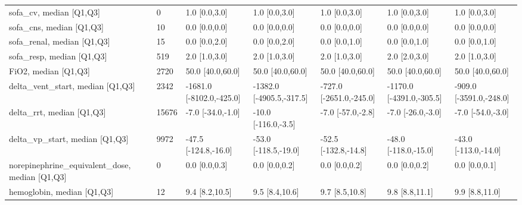 \begin{tabular}{llllllll}
sofa\_cv, median [Q1,Q3] &                                   &               0 &             1.0 [0.0,3.0] &             1.0 [0.0,3.0] &            1.0 [0.0,3.0] &             1.0 [0.0,3.0] &            1.0 [0.0,3.0] \\
sofa\_cns, median [Q1,Q3] &                                   &              10 &             0.0 [0.0,0.0] &             0.0 [0.0,0.0] &            0.0 [0.0,0.0] &             0.0 [0.0,0.0] &            0.0 [0.0,0.0] \\
sofa\_renal, median [Q1,Q3] &                                   &              15 &             0.0 [0.0,2.0] &             0.0 [0.0,2.0] &            0.0 [0.0,1.0] &             0.0 [0.0,1.0] &            0.0 [0.0,1.0] \\
sofa\_resp, median [Q1,Q3] &                                   &             519 &             2.0 [1.0,3.0] &             2.0 [1.0,3.0] &            2.0 [1.0,3.0] &             2.0 [2.0,3.0] &            2.0 [1.0,3.0] \\
FiO2, median [Q1,Q3] &                                   &            2720 &          50.0 [40.0,60.0] &          50.0 [40.0,60.0] &         50.0 [40.0,60.0] &          50.0 [40.0,60.0] &         50.0 [40.0,60.0] \\
delta\_vent\_start, median [Q1,Q3] &                                   &            2342 &  -1681.0 [-8102.0,-425.0] &  -1382.0 [-4905.5,-317.5] &  -727.0 [-2651.0,-245.0] &  -1170.0 [-4391.0,-305.5] &  -909.0 [-3591.0,-248.0] \\
delta\_rrt, median [Q1,Q3] &                                   &           15676 &         -7.0 [-34.0,-1.0] &       -10.0 [-116.0,-3.5] &        -7.0 [-57.0,-2.8] &         -7.0 [-26.0,-3.0] &        -7.0 [-54.0,-3.0] \\
delta\_vp\_start, median [Q1,Q3] &                                   &            9972 &      -47.5 [-124.8,-16.0] &      -53.0 [-118.5,-19.0] &     -52.5 [-132.8,-14.8] &      -48.0 [-118.0,-15.0] &     -43.0 [-113.0,-14.0] \\
norepinephrine\_equivalent\_dose, median [Q1,Q3] &                                   &               0 &             0.0 [0.0,0.3] &             0.0 [0.0,0.2] &            0.0 [0.0,0.2] &             0.0 [0.0,0.2] &            0.0 [0.0,0.1] \\
hemoglobin, median [Q1,Q3] &                                   &              12 &            9.4 [8.2,10.5] &            9.5 [8.4,10.6] &           9.7 [8.5,10.8] &            9.8 [8.8,11.1] &           9.9 [8.8,11.0] \\

\end{tabular}
